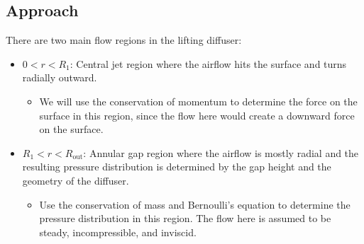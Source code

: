 \documentclass[11pt]{article}
\begin{document}
\subsection*{Approach}
There are two main flow regions in the lifting diffuser:
\begin{itemize}
    \item $0<r<R_1$: Central jet region where the airflow hits the surface and turns radially outward.
    \begin{itemize}
        \item We will use the conservation of momentum to determine the force on the surface in this region, since the flow here would create a downward force on the surface.
    \end{itemize}
    \item $R_1<r<R_\text{out}$: Annular gap region where the airflow is mostly radial and the resulting pressure distribution is determined by the gap height and the geometry of the diffuser.
    \begin{itemize}
        \item Use the conservation of mass and Bernoulli's equation to determine the pressure distribution in this region. The flow here is assumed to be steady, incompressible, and inviscid.
    \end{itemize}
\end{itemize}
\end{document}
